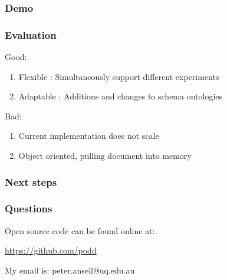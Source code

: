 \documentclass[12pt]{beamer}
\begin{document}
\bgroup
{}
\begin{frame}[plain]{}
\end{frame}
\egroup

\begin{frame}
\frametitle{Demo} 

\end{frame}

\begin{frame}
\frametitle{Evaluation}

Good:

\begin{enumerate}
 \item Flexible : Simultaneously support different experiments
 \item Adaptable : Additions and changes to schema ontologies
\end{enumerate}

Bad:

\begin{enumerate}
 \item Current implementation does not scale
 \item Object oriented, pulling document into memory
\end{enumerate}


\end{frame}

\begin{frame}
\frametitle{Next steps}

\end{frame}


\begin{frame}
\frametitle{Questions}

\begin{center}
Open source code can be found online at:

\url{https://github.com/podd}

\vskip 12pt

My email is: peter.ansell@uq.edu.au
\end{center}
\end{frame}
\end{document}
